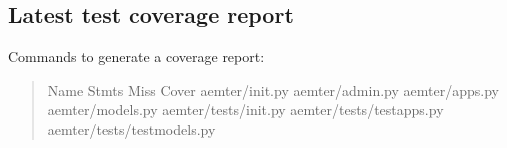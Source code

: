 \documentclass[letterpaper,10pt,english]{sphinxmanual}
\begin{document}
\subsection{Latest test coverage report}
\label{\detokenize{masterCodeDoc:latest-test-coverage-report}}
Commands to generate a coverage report:
\begin{quote}
\begin{quote}

\begin{DUlineblock}{0em}
\item[] 
\item[] 
\end{DUlineblock}
\end{quote}
\def\sphinxLiteralBlockLabel{\label{\detokenize{masterCodeDoc:id14}}}
\begin{sphinxVerbatim}[commandchars=\\\{\}]
Name                                           Stmts   Miss  Cover
\PYGZhy{}\PYGZhy{}\PYGZhy{}\PYGZhy{}\PYGZhy{}\PYGZhy{}\PYGZhy{}\PYGZhy{}\PYGZhy{}\PYGZhy{}\PYGZhy{}\PYGZhy{}\PYGZhy{}\PYGZhy{}\PYGZhy{}\PYGZhy{}\PYGZhy{}\PYGZhy{}\PYGZhy{}\PYGZhy{}\PYGZhy{}\PYGZhy{}\PYGZhy{}\PYGZhy{}\PYGZhy{}\PYGZhy{}\PYGZhy{}\PYGZhy{}\PYGZhy{}\PYGZhy{}\PYGZhy{}\PYGZhy{}\PYGZhy{}\PYGZhy{}\PYGZhy{}\PYGZhy{}\PYGZhy{}\PYGZhy{}\PYGZhy{}\PYGZhy{}\PYGZhy{}\PYGZhy{}\PYGZhy{}\PYGZhy{}\PYGZhy{}\PYGZhy{}\PYGZhy{}\PYGZhy{}\PYGZhy{}\PYGZhy{}\PYGZhy{}\PYGZhy{}\PYGZhy{}\PYGZhy{}\PYGZhy{}\PYGZhy{}\PYGZhy{}\PYGZhy{}\PYGZhy{}\PYGZhy{}\PYGZhy{}\PYGZhy{}\PYGZhy{}\PYGZhy{}\PYGZhy{}\PYGZhy{}
aemter/\PYGZus{}\PYGZus{}init\PYGZus{}\PYGZus{}.py                                          \PYGZpc{}
aemter/admin.py                                            \PYGZpc{}
aemter/apps.py                                              \PYGZpc{}
aemter/models.py                                            \PYGZpc{}
aemter/tests/\PYGZus{}\PYGZus{}init\PYGZus{}\PYGZus{}.py                                    \PYGZpc{}
aemter/tests/test\PYGZus{}apps.py                                   \PYGZpc{}
aemter/tests/test\PYGZus{}models.py                                \PYGZpc{}

\end{sphinxVerbatim}
\end{quote}
\end{document}
